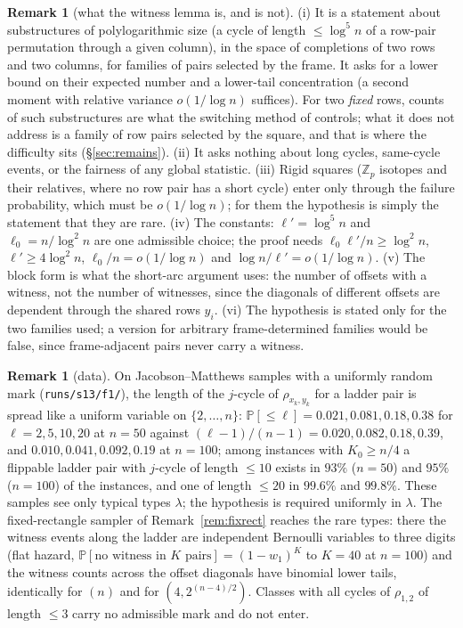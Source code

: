 \documentclass[11pt]{article}
\theoremstyle{definition}
\newtheorem{remark}[theorem]{Remark}
\renewcommand{\Pr}{\mathbb{P}}
\begin{document}
\begin{remark}[what the witness lemma is, and is not]
(i) It is a statement about substructures of polylogarithmic size
(a cycle of length $\le\log^5n$ of a row-pair permutation through a
given column), in the space of completions of two rows and two
columns, for families of pairs selected by the frame.  It asks for a
lower bound on their expected number and a lower-tail
concentration (a second moment with relative variance $o(1/\log n)$
suffices).  For two \emph{fixed} rows, counts of such substructures
are what the switching method of \cite{KS18} controls; what it does
not address is a family of row pairs selected by the square, and that
is where the difficulty sits (\S\ref{sec:remains}).
(ii) It asks nothing about long cycles, same-cycle events, or the
fairness of any global statistic.  (iii) Rigid squares ($\mathbb Z_p$
isotopes and their relatives, where no row pair has a short cycle)
enter only through the failure probability, which must be
$o(1/\log n)$; for them the hypothesis is simply the statement that
they are rare.  (iv) The constants: $\ell'=\log^5n$ and
$\ell_0=n/\log^2n$ are one admissible choice; the proof needs
$\ell_0\ell'/n\ge\log^2n$, $\ell'\ge4\log^2n$, $\ell_0/n=o(1/\log n)$ and
$\log n/\ell'=o(1/\log n)$.  (v) The block form is what the
short-arc argument uses: the number of offsets with a witness, not the
number of witnesses, since the diagonals of different offsets are
dependent through the shared rows $y_i$.  (vi) The hypothesis is
stated only for the two families used; a version for arbitrary
frame-determined families would be false, since frame-adjacent pairs
never carry a witness.
\end{remark}


\begin{remark}[data]\label{rem:witnessdata}
On Jacobson--Matthews samples with a uniformly random mark (\texttt{runs/s13/f1/}), the
length of the $j$-cycle of $\rho_{x_k,y_k}$ for a ladder pair is spread like a uniform
variable on $\{2,\dots,n\}$: $\Pr[\le\ell]=0.021,0.081,0.18,0.38$ for $\ell=2,5,10,20$ at
$n=50$ against $(\ell-1)/(n-1)=0.020,0.082,0.18,0.39$, and $0.010,0.041,0.092,0.19$ at
$n=100$; among instances with $K_0\ge n/4$ a flippable ladder pair with $j$-cycle of length
$\le10$ exists in $93\%$ ($n=50$) and $95\%$ ($n=100$) of the instances, and one of length
$\le20$ in $99.6\%$ and $99.8\%$.  These samples see only typical types $\lambda$; the
hypothesis is required uniformly in $\lambda$.  The fixed-rectangle sampler of
Remark~\ref{rem:fixrect} reaches the rare types: there the witness events along the ladder
are independent Bernoulli variables to three digits (flat hazard,
$\Pr[\text{no witness in }K\text{ pairs}]=(1-w_1)^K$ to $K=40$ at $n=100$) and the witness
counts across the offset diagonals have binomial lower tails, identically for $(n)$ and for
$(4,2^{(n-4)/2})$.  Classes with all cycles of $\rho_{1,2}$ of length $\le3$ carry no
admissible mark and do not enter.
\end{remark}
\end{document}
